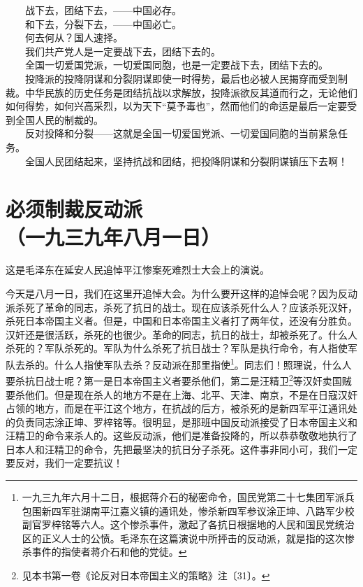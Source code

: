 \documentclass[cn,11pt,chinese]{elegantbook}
\def\myformat#1{\hfil\hfil #1}
\begin{document}
　　战下去，团结下去，——中国必存。\\
　　和下去，分裂下去，——中国必亡。\\
　　何去何从？国人速择。\\
　　我们共产党人是一定要战下去，团结下去的。\\
　　全国一切爱国党派，一切爱国同胞，也是一定要战下去，团结下去的。\\
　　投降派的投降阴谋和分裂阴谋即使一时得势，最后也必被人民揭穿而受到制裁。中华民族的历史任务是团结抗战以求解放，投降派欲反其道而行之，无论他们如何得势，如何兴高采烈，以为天下“莫予毒也”，然而他们的命运是最后一定要受到全国人民的制裁的。\\
　　反对投降和分裂——这就是全国一切爱国党派、一切爱国同胞的当前紧急任务。\\
　　全国人民团结起来，坚持抗战和团结，把投降阴谋和分裂阴谋镇压下去啊！\\
\newpage\section*{\myformat{必须制裁反动派}\\\myformat{（一九三九年八月一日）}}
\begin{introduction}\item  这是毛泽东在延安人民追悼平江惨案死难烈士大会上的演说。\end{introduction}
今天是八月一日，我们在这里开追悼大会。为什么要开这样的追悼会呢？因为反动派杀死了革命的同志，杀死了抗日的战士。现在应该杀死什么人？应该杀死汉奸，杀死日本帝国主义者。但是，中国和日本帝国主义者打了两年仗，还没有分胜负。汉奸还是很活跃，杀死的也很少。革命的同志，抗日的战士，却被杀死了。什么人杀死的？军队杀死的。军队为什么杀死了抗日战士？军队是执行命令，有人指使军队去杀的。什么人指使军队去杀？反动派在那里指使\footnote[1]{ 一九三九年六月十二日，根据蒋介石的秘密命令，国民党第二十七集团军派兵包围新四军驻湖南平江嘉义镇的通讯处，惨杀新四军参议涂正坤、八路军少校副官罗梓铭等六人。这个惨杀事件，激起了各抗日根据地的人民和国民党统治区的正义人士的公愤。毛泽东在这篇演说中所抨击的反动派，就是指的这次惨杀事件的指使者蒋介石和他的党徒。}。同志们！照理说，什么人要杀抗日战士呢？第一是日本帝国主义者要杀他们，第二是汪精卫\footnote[2]{ 见本书第一卷《论反对日本帝国主义的策略》注〔31〕。}等汉奸卖国贼要杀他们。但是现在杀人的地方不是在上海、北平、天津、南京，不是在日寇汉奸占领的地方，而是在平江这个地方，在抗战的后方，被杀死的是新四军平江通讯处的负责同志涂正坤、罗梓铭等。很明显，是那班中国反动派接受了日本帝国主义和汪精卫的命令来杀人的。这些反动派，他们是准备投降的，所以恭恭敬敬地执行了日本人和汪精卫的命令，先把最坚决的抗日分子杀死。这件事非同小可，我们一定要反对，我们一定要抗议！\\
\end{document}
